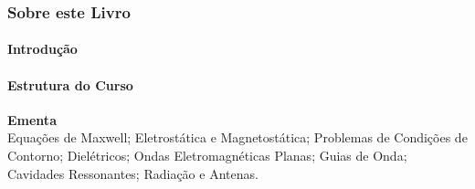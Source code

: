\subsubsection{Sobre este Livro}

\paragraph{Introdução}

\paragraph{Estrutura do Curso}

\begin{framed}
\textbf{Ementa}\\
Equações de Maxwell; Eletrostática e Magnetostática; Problemas de Condições de Contorno; Dielétricos; Ondas Eletromagnéticas Planas; Guias de Onda; Cavidades Ressonantes; Radiação e Antenas.
\end{framed}

